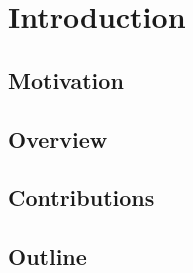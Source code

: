 \chapter{Introduction}
\section{Motivation}
\section{Overview}
\section{Contributions}
\section{Outline}